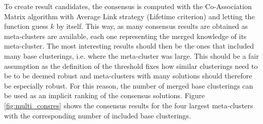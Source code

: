 \documentclass[
	a4paper,
	english,
	twoside,
	openright,               
	11pt                            
	]{report}
\begin{document}
To create result candidates, the consensus is computed with the Co-Association Matrix algorithm with Average Link strategy (Lifetime criterion) and letting the function guess $k$ by itself. This way, as many consensus results are obtained as meta-clusters are available, each one representing the merged knowledge of its meta-cluster. The most interesting results should then be the ones that included many base clusterings, i.e. where the meta-cluster was large. This should be a fair assumption as the definition of the threshold fixes how similar clusterings need to be to be deemed robust and meta-clusters with many solutions should therefore be especially robust. For this reason, the number of merged base clusterings can be used as an implicit ranking of the consensus solutions. Figure \ref{fig:multi_consres} shows the consensus results for the four largest meta-clusters with the corresponding number of included base clusterings.
\end{document}
